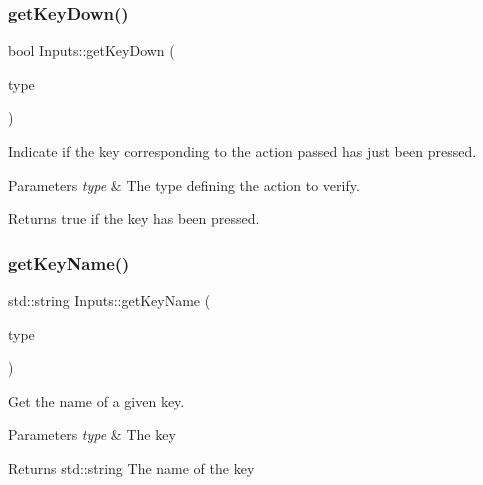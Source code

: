 \subsubsection{\texorpdfstring{get\+Key\+Down()}{getKeyDown()}}
{\footnotesize\ttfamily bool Inputs\+::get\+Key\+Down (\begin{DoxyParamCaption}\item[{Input\+Type\+::\+Enum}]{type }\end{DoxyParamCaption})\hspace{0.3cm}{\ttfamily [static]}}

Indicate if the key corresponding to the action passed has just been pressed.


\begin{DoxyParams}{Parameters}
{\em type} & The type defining the action to verify. \\
\hline
\end{DoxyParams}
\begin{DoxyReturn}{Returns}
true if the key has been pressed. 
\end{DoxyReturn}
\mbox{\label{class_inputs_a868ed87a88ec0c694e5c27effeea2bc9}} 
\subsubsection{\texorpdfstring{get\+Key\+Name()}{getKeyName()}}
{\footnotesize\ttfamily std\+::string Inputs\+::get\+Key\+Name (\begin{DoxyParamCaption}\item[{Input\+Type\+::\+Enum}]{type }\end{DoxyParamCaption})\hspace{0.3cm}{\ttfamily [static]}}



Get the name of a given key. 


\begin{DoxyParams}{Parameters}
{\em type} & The key \\
\hline
\end{DoxyParams}
\begin{DoxyReturn}{Returns}
std\+::string The name of the key 
\end{DoxyReturn}
\mbox{\label{class_inputs_a3e6b234f0035948679c8ff831d1efc5a}} 
